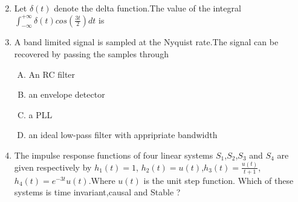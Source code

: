 \documentclass[journal,12pt,twocolumn]{IEEEtran}
\begin{document}
\begin{enumerate}[1.]
\begin{enumerate}[(A)]
\begin{multicols}{2}
\end{multicols}
\end{enumerate}


\item Let $\delta(t)$ denote the delta function.The value of the integral $\int_{-\infty}^{+\infty} \delta(t) cos(\frac{3t}{2}) dt$ is\\

\begin{enumerate}[(A)]
\end{enumerate}


\item A band limited signal is sampled at the Nyquist rate.The signal can be recovered by passing the samples through\\

\begin{enumerate}[(A)]

\setlength\itemsep{1em}

\item An RC filter
\item an envelope detector
\item a PLL
\item an ideal low-pass filter with appripriate bandwidth


\end{enumerate}

\item The impulse response functions of four linear systems $S_1$,$S_2$,$S_3$ and $S_4$ are given respectively by
\newline $h_1(t)=1$, $h_2(t)=u(t)$,$h_3(t)=\frac{u(t)}{t+1}$, $h_4(t)=e^{-3t}u(t)$.Where $u(t)$ is the unit step function. Which of these systems is time invariant,causal and Stable ?
\begin{enumerate}[(A)]
\end{enumerate}
\end{enumerate}
\end{document}
